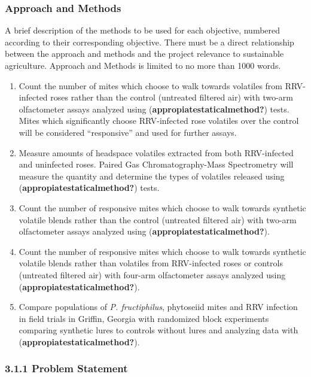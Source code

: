 \documentclass[12pt,final,CPage]{ufthesis}
\begin{document}
{{  \subsubsection{Approach and Methods}\label{approach-and-methods}}

  A brief description of the methods to be used for each objective, numbered according to their corresponding objective. There must be a direct relationship between the approach and methods and the project relevance to sustainable agriculture. Approach and Methods is limited to no more than 1000 words.
  \begin{enumerate}
  \def\labelenumi{\arabic{enumi}.}
  \tightlist
  \item
    Count the number of mites which choose to walk towards volatiles from RRV-infected roses rather than the control (untreated filtered air) with two-arm olfactometer assays analyzed using (\textbf{appropiatestaticalmethod?}) tests. Mites which significantly choose RRV-infected rose volatiles over the control will be considered ``responsive'' and used for further assays.
  \item
    Measure amounts of headspace volatiles extracted from both RRV-infected and uninfected roses. Paired Gas Chromatography-Mass Spectrometry will measure the quantity and determine the types of volatiles released using (\textbf{appropiatestaticalmethod?}) tests.
  \item
    Count the number of responsive mites which choose to walk towards synthetic volatile blends rather than the control (untreated filtered air) with two-arm olfactometer assays analyzed using (\textbf{appropiatestaticalmethod?}).
  \item
    Count the number of responsive mites which choose to walk towards synthetic volatile blends rather than volatiles from RRV-infected roses or controls (untreated filtered air) with four-arm olfactometer assays analyzed using (\textbf{appropiatestaticalmethod?}).
  \item
    Compare populations of \emph{P. fructiphilus}, phytoseiid mites and RRV infection in field trials in Griffin, Georgia with randomized block experiments comparing synthetic lures to controls without lures and analyzing data with (\textbf{appropiatestaticalmethod?}).
  \end{enumerate}
  \hypertarget{problem-statement-1}{%
  \subsubsection{3.1.1 Problem Statement}\label{problem-statement-1}}

}
\end{document}
